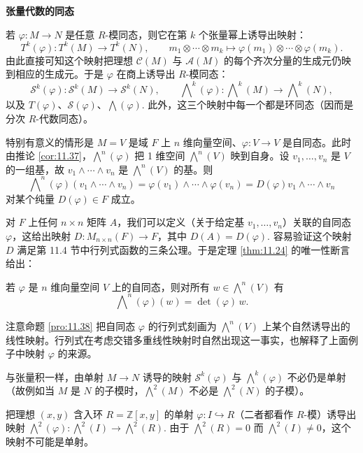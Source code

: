 \noindent\textbf{张量代数的同态}

若 \(\varphi : M \to N\) 是任意 \(R\)-模同态，则它在第 \(k\) 个张量幂上诱导出映射：
\[
T^k(\varphi) : T^k(M) \to T^k(N), \qquad m_1 \otimes \cdots \otimes m_k \longmapsto \varphi(m_1) \otimes \cdots \otimes \varphi(m_k).
\]
由此直接可知这个映射把理想 \(\mathcal{C}(M)\) 与 \(\mathcal{A}(M)\) 的每个齐次分量的生成元仍映到相应的生成元。于是 \(\varphi\) 在商上诱导出 \(R\)-模同态：
\[
\mathcal{S}^k(\varphi) : \mathcal{S}^k(M) \to \mathcal{S}^k(N), \qquad \bigwedge\nolimits^k(\varphi) : \bigwedge\nolimits^k(M) \to \bigwedge\nolimits^k(N),
\]
以及 \(T(\varphi)\)、\(\mathcal{S}(\varphi)\)、\(\bigwedge(\varphi)\). 此外，这三个映射中每一个都是环同态（因而是分次 \(R\)-代数同态）。

特别有意义的情形是 \(M = V\) 是域 \(F\) 上 \(n\) 维向量空间、\(\varphi : V \to V\) 是自同态。此时由推论 \ref{cor:11.37}，\(\bigwedge^n(\varphi)\) 把 1 维空间 \(\bigwedge^n(V)\) 映到自身。设 \(v_1, \ldots, v_n\) 是 \(V\) 的一组基，故 \(v_1 \wedge \cdots \wedge v_n\) 是 \(\bigwedge^n(V)\) 的基。则
\[
\bigwedge\nolimits^n(\varphi)(v_1 \wedge \cdots \wedge v_n) = \varphi(v_1) \wedge \cdots \wedge \varphi(v_n) = D(\varphi)v_1 \wedge \cdots \wedge v_n
\]
对某个纯量 \(D(\varphi) \in F\) 成立。

对 \(F\) 上任何 \(n \times n\) 矩阵 \(A\)，我们可以定义（关于给定基 \(v_1, \ldots, v_n\)）关联的自同态 \(\varphi\)，这给出映射 \(D : M_{n \times n}(F) \to F\)，其中 \(D(A) = D(\varphi)\). 容易验证这个映射 \(D\) 满足第 11.4 节中行列式函数的三条公理。于是定理 \ref{thm:11.24} 的唯一性断言给出：

\begin{proposition}\label{pro:11.38}
若 \(\varphi\) 是 \(n\) 维向量空间 \(V\) 上的自同态，则对所有 \(w \in \bigwedge^n(V)\) 有
\[
\bigwedge\nolimits^n(\varphi)(w) = \det(\varphi)\,w.
\]
\end{proposition}

注意命题 \ref{pro:11.38} 把自同态 \(\varphi\) 的行列式刻画为 \(\bigwedge^n(V)\) 上某个自然诱导出的线性映射。行列式在考虑交错多重线性映射时自然出现这一事实，也解释了上面例子中映射 \(\varphi\) 的来源。

与张量积一样，由单射 \(M \to N\) 诱导的映射 \(\mathcal{S}^k(\varphi)\) 与 \(\bigwedge^k(\varphi)\) 不必仍是单射（故例如当 \(M\) 是 \(N\) 的子模时，\(\bigwedge^2(M)\) 不必是 \(\bigwedge^2(N)\) 的子模）。

\begin{example}
把理想 \((x, y)\) 含入环 \(R = \mathbb{Z}[x, y]\) 的单射 \(\varphi : I \hookrightarrow R\)（二者都看作 \(R\)-模）诱导出映射 \(\bigwedge^2(\varphi) : \bigwedge^2(I) \to \bigwedge^2(R)\). 由于 \(\bigwedge^2(R) = 0\) 而 \(\bigwedge^2(I) \neq 0\)，这个映射不可能是单射。
\end{example}

